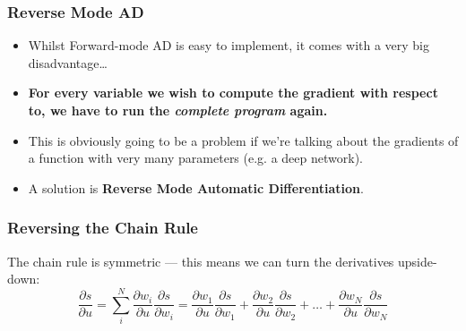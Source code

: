 \documentclass[\beamerclass]{beamer}
\begin{document}

\begin{frame}
\frametitle{Reverse Mode AD}
\begin{itemize}
	\item<+-> Whilst Forward-mode AD is easy to implement, it comes with a very big disadvantage\ldots
	\item<+-> \textbf{For every variable we wish to compute the gradient with respect to, we have to run the \emph{complete program} again.}
	\item<+-> This is obviously going to be a problem if we're talking about the gradients of a function with very many parameters (e.g. a deep network).
	\item<+-> A solution is \textbf{Reverse Mode Automatic Differentiation}. 
\end{itemize}
\end{frame}

\begin{frame}
\frametitle{Reversing the Chain Rule}

The chain rule is symmetric --- this means we can turn the derivatives upside-down:
\begin{equation*}
	\frac{\partial s}{\partial u} = \sum_i^N \frac{\partial w_i}{\partial u} \frac{\partial s}{\partial w_i} = \frac{\partial w_1}{\partial u}\frac{\partial s}{\partial w_1} + \frac{\partial w_2}{\partial u}\frac{\partial s}{\partial w_2} + \dots + \frac{\partial w_N}{\partial u}\frac{\partial s}{\partial w_N}
\end{equation*}

\\[1em]

\end{frame}
\end{document}
